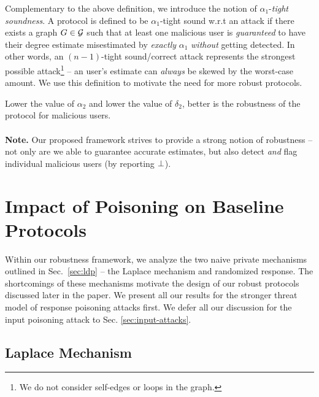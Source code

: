 Complementary to the above definition, we introduce the notion of $\alpha_1$-\textit{tight soundness}. A protocol is defined to be $\alpha_1$-tight sound w.r.t an attack if there exists a graph $G \in \mathcal{G}$ such that at least one malicious user is \textit{guaranteed} to have their degree estimate misestimated by \textit{exactly} $\alpha_1$ \textit{without} getting detected.  %
In other words, an $(n-1)$-tight sound/correct attack represents the strongest possible attack\footnote{We do not consider self-edges or loops in the graph.} -- an user's estimate can \textit{always} be skewed by the worst-case amount. We use this definition to motivate the need for more robust protocols. %
\par Lower the value of
$\alpha_2$ and lower the value of $\delta_2$, better is the robustness of the protocol for malicious users.  
  \vspace{-0.2cm}  \\\\
\noindent\textbf{Note.} Our proposed  framework strives to provide a strong notion of robustness -- not only are we able to guarantee accurate estimates, but also detect  \textit{and} flag individual malicious users (by reporting $\perp$). %
\section{Impact of Poisoning on Baseline Protocols}

Within our robustness framework, we analyze the two naive private mechanisms outlined in Sec.~\ref{sec:ldp} -- the Laplace mechanism and randomized response. The shortcomings of these mechanisms motivate the design of our robust protocols discussed later in the paper. We present all our results for the stronger threat model of response poisoning attacks first. We defer all our discussion for the input poisoning attack to Sec. \ref{sec:input-attacks}. 

\subsection{Laplace Mechanism}

